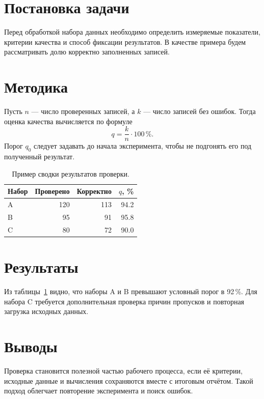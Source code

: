 \documentclass[courseproj]{omgtudoc-asoiu}
\begin{document}
\maketitle

\begin{abstract}
В этой учебной статье приведён небольшой воспроизводимый пример анализа
качества данных. Структура документа подходит для курсовой работы или
технического отчёта: постановка задачи, методика, результаты и выводы.
\end{abstract}

\section{Постановка задачи}
Перед обработкой набора данных необходимо определить измеряемые показатели,
критерии качества и способ фиксации результатов. В качестве примера будем
рассматривать долю корректно заполненных записей.

\section{Методика}
Пусть $n$ --- число проверенных записей, а $k$ --- число записей без ошибок.
Тогда оценка качества вычисляется по формуле
\begin{equation}
  q = \frac{k}{n}\cdot 100\,\% .
\end{equation}
Порог $q_0$ следует задавать до начала эксперимента, чтобы не подгонять его
под полученный результат.

\begin{table}[ht]
  \centering
  \caption{Пример сводки результатов проверки.}
  \label{tab:quality}
  \begin{tabular}{lrrr}
    \toprule
    Набор & Проверено & Корректно & $q$, \% \\
    \midrule
    A & 120 & 113 & 94.2 \\
    B & 95 & 91 & 95.8 \\
    C & 80 & 72 & 90.0 \\
    \bottomrule
  \end{tabular}
\end{table}

\section{Результаты}
Из таблицы~\ref{tab:quality} видно, что наборы A и B превышают условный
порог в 92\,\%. Для набора C требуется дополнительная проверка причин
пропусков и повторная загрузка исходных данных.

\section{Выводы}
Проверка становится полезной частью рабочего процесса, если её критерии,
исходные данные и вычисления сохраняются вместе с итоговым отчётом. Такой
подход облегчает повторение эксперимента и поиск ошибок.
\end{document}
